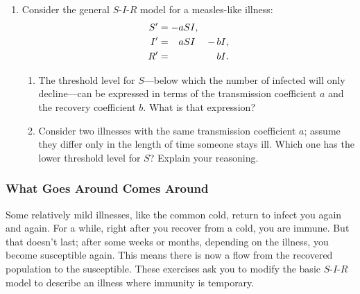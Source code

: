 \begin{enumerate}
\begin{enumerate}
\end{enumerate}
\item Consider the general $S$-$I$-$R$ model for a measles-like
illness:
\begin{alignat*}{2}
S' &=  - a S I,         &     &     \\
I' &= \hphantom{-}a S I & -\, & b I,  \\
R' &=                   &     & b I.
\end{alignat*}


  \begin{enumerate}
  \item The threshold level for $S$---below which the number of infected
will only decline---can be expressed in terms of the transmission
coefficient $a$ and the recovery coefficient $b$.  What is that
expression?\label{`setthresh'}


  \item Consider two illnesses with the same transmission coefficient
$a$; assume they differ only in the length of time someone stays ill.
Which one has the lower threshold level for $S$?  Explain your
reasoning.


\end{enumerate}
\end{enumerate}
\subsubsection{What Goes Around Comes Around}
\label{subsubsec:what-goes-around-comes-around}

Some relatively mild illnesses, like the common cold, return to infect
you again and again.  For a while, right after you recover from a
cold, you are immune.  But that doesn't last; after some weeks or
months, depending on the illness, you become susceptible again.  This
means there is now a flow from the recovered population to the
susceptible.  These exercises ask you to modify the basic $S$-$I$-$R$
model to describe an illness where immunity is temporary.


